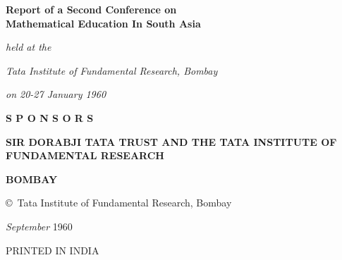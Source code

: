 \thispagestyle{empty}

\begin{center}
{\Large\bf Report of a Second Conference on}\\[5pt]
{\Large\bf Mathematical Education In South Asia}
\vfill

{\em held at the}
\smallskip

{\em Tata Institute of Fundamental Research, Bombay}
\smallskip

{\em on 20-27 January 1960}
\vfill

{\footnotesize\bf S P O N S O R S}
\medskip

{\bf SIR DORABJI TATA TRUST AND THE TATA INSTITUTE OF FUNDAMENTAL RESEARCH}

{\bf BOMBAY}
\end{center}

\noindent


\eject

\thispagestyle{empty}
\begin{center}
\copyright\ Tata Institute of Fundamental Research, Bombay

\textit{September} 1960
\end{center}
\vfill

\begin{center}
{\fontsize{9pt}{11pt}\selectfont
PRINTED IN INDIA}\relax
\end{center}
